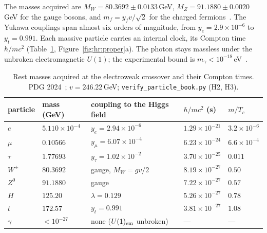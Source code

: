 The masses acquired are $M_W=80.3692\pm0.0133$\,GeV, $M_Z=91.1880\pm0.0020$\,GeV for the gauge bosons, and $m_f=y_fv/\sqrt2$ for the charged
fermions~\cite{PDG2024}. \observed{} The Yukawa couplings span almost six orders of magnitude, from $y_e=2.9\times10^{-6}$ to $y_t=0.991$. \calc{}
Each massive particle carries an internal clock, its Compton time $\hbar/mc^2$ (Table~\ref{tab:hr:masses}, Figure~\ref{fig:hr:proper}a). The
photon stays massless under the unbroken electromagnetic $U(1)$; the experimental bound is $m_\gamma<10^{-18}$\,eV~\cite{PDG2024}. \observed

\begin{table}[htbp]\centering\small
\caption{Rest masses acquired at the electroweak crossover and their Compton times. PDG 2024~\cite{PDG2024}; $v=246.22$\,GeV;
\texttt{verify\_particle\_book.py} (H2, H3).}\label{tab:hr:masses}
\begin{tabular}{lllll}\toprule
particle & mass (GeV) & coupling to the Higgs field & $\hbar/mc^2$ (s) & $m/T_c$\\\midrule
$e$ & $5.110\times10^{-4}$ & $y_e=2.94\times10^{-6}$ & $1.29\times10^{-21}$ & $3.2\times10^{-6}$\\
$\mu$ & $0.10566$ & $y_\mu=6.07\times10^{-4}$ & $6.23\times10^{-24}$ & $6.6\times10^{-4}$\\
$\tau$ & $1.77693$ & $y_\tau=1.02\times10^{-2}$ & $3.70\times10^{-25}$ & $0.011$\\
$W^\pm$ & $80.3692$ & gauge, $M_W=gv/2$ & $8.19\times10^{-27}$ & $0.50$\\
$Z^0$ & $91.1880$ & gauge & $7.22\times10^{-27}$ & $0.57$\\
$H$ & $125.20$ & $\lambda=0.129$ & $5.26\times10^{-27}$ & $0.78$\\
$t$ & $172.57$ & $y_t=0.991$ & $3.81\times10^{-27}$ & $1.08$\\
$\gamma$ & $<10^{-27}$ & none ($U(1)_{\rm em}$ unbroken) & --- & ---\\\bottomrule
\end{tabular}
\end{table}

